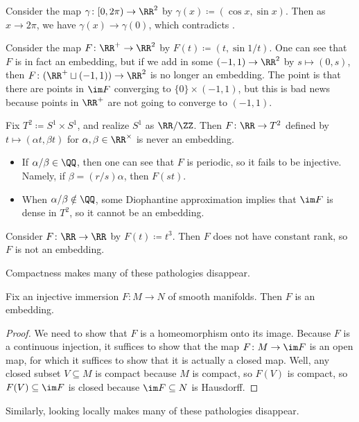 \documentclass[../notes.tex]{subfiles}
\begin{document}
\begin{nex}
	Consider the map $\gamma\colon[0,2\pi)\to\RR^2$ by $\gamma(x)\coloneqq(\cos x,\sin x)$. Then as $x\to2\pi$, we have $\gamma(x)\to\gamma(0)$, which contradicts .
\end{nex}
\begin{nex}
	Consider the map $F\colon\RR^+\to\RR^2$ by $F(t)\coloneqq(t,\sin 1/t)$. One can see that $F$ is in fact an embedding, but if we add in some $(-1,1)\to\RR^2$ by $s\mapsto(0,s)$, then $F\colon(\RR^+\sqcup(-1,1))\to\RR^2$ is no longer an embedding. The point is that there are points in $\im F$ converging to $\{0\}\times(-1,1)$, but this is bad news because points in $\RR^+$ are not going to converge to $(-1,1)$.
\end{nex}
\begin{nex}
	Fix $T^2\coloneqq S^1\times S^1$, and realize $S^1$ as $\RR/\ZZ$. Then $F\colon\RR\to T^2$ defined by $t\mapsto(\alpha t,\beta t)$ for $\alpha,\beta\in\RR^\times$ is never an embedding.
	\begin{itemize}
		\item If $\alpha/\beta\in\QQ$, then one can see that $F$ is periodic, so it fails to be injective. Namely, if $\beta=(r/s)\alpha$, then $F(st)$.
		\item When $\alpha/\beta\notin\QQ$, some Diophantine approximation implies that $\im F$ is dense in $T^2$, so it cannot be an embedding.
	\end{itemize}
\end{nex}
\begin{nex}
	Consider $F\colon\RR\to\RR$ by $F(t)\coloneqq t^3$. Then $F$ does not have constant rank, so $F$ is not an embedding.
\end{nex}
Compactness makes many of these pathologies disappear.
\begin{proposition}
	Fix an injective immersion $F\colon M\to N$ of smooth manifolds. Then $F$ is an embedding.
\end{proposition}
\begin{proof}
	We need to show that $F$ is a homeomorphism onto its image. Because $F$ is a continuous injection, it suffices to show that the map $F\colon M\to\im F$ is an open map, for which it suffices to show that it is actually a closed map. Well, any closed subset $V\subseteq M$ is compact because $M$ is compact, so $F(V)$ is compact, so $F(V)\subseteq\im F$ is closed because $\im F\subseteq N$ is Hausdorff.
\end{proof}
Similarly, looking locally makes many of these pathologies disappear.
\end{document}
